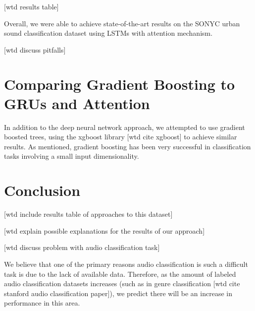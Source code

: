 [wtd results table]

Overall, we were able to achieve state-of-the-art results on the SONYC urban sound classification dataset using LSTMs with attention mechanism.

[wtd discuss pitfalls]

\chapter{Comparing Gradient Boosting to GRUs and Attention}

In addition to the deep neural network approach, we attempted to use gradient boosted trees, using the xgboost library [wtd cite xgboost] to achieve similar results.  As mentioned, gradient boosting has been very successful in classification tasks involving a small input dimensionality.

\chapter{Conclusion}

[wtd include results table of approaches to this dataset]

[wtd explain possible explanations for the results of our approach]

[wtd discuss problem with audio classification task]

We believe that one of the primary reasons audio classification is such a difficult task is due to the lack of available data.  Therefore, as the amount of labeled audio classification datasets increases (such as in genre classification [wtd cite stanford audio classification paper]), we predict there will be an increase in performance in this area.


